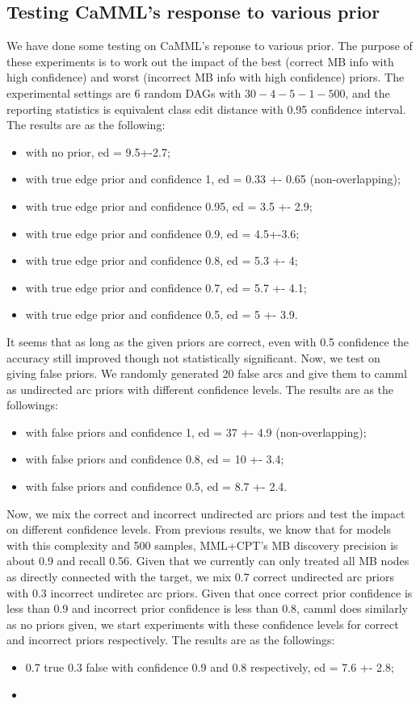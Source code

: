 \subsection{Testing CaMML's response to various prior}
We have done some testing on CaMML's reponse to various prior. The purpose of these experiments is to work out the impact of the best (correct MB info with high confidence) and worst (incorrect MB info with high confidence) priors. The experimental settings are 6 random DAGs with $30-4-5-1-500$, and the reporting statistics is equivalent class edit distance with 0.95 confidence interval. The results are as the following: 
\begin{itemize}
\item with no prior, ed = 9.5+-2.7;
\item with true edge prior and confidence 1, ed = 0.33 +- 0.65 (non-overlapping);
\item with true edge prior and confidence 0.95, ed = 3.5 +- 2.9;
\item with true edge prior and confidence 0.9, ed = 4.5+-3.6;
\item with true edge prior and confidence 0.8, ed = 5.3 +- 4;
\item with true edge prior and confidence 0.7, ed = 5.7 +- 4.1;
\item with true edge prior and confidence 0.5, ed = 5 +- 3.9.
\end{itemize}
It seems that as long as the given priors are correct, even with 0.5 confidence the accuracy still improved though not statistically significant. Now, we test on giving false priors. We randomly generated 20 false arcs and give them to camml as undirected arc priors with different confidence levels. The results are as the followings: 
\begin{itemize}
\item with false priors and confidence 1, ed = 37 +- 4.9 (non-overlapping); 
\item with false priors and confidence 0.8, ed = 10 +- 3.4;
\item with false priors and confidence 0.5, ed = 8.7 +- 2.4.
\end{itemize}
Now, we mix the correct and incorrect undirected arc priors and test the impact on different confidence levels. From previous results, we know that for models with this complexity and 500 samples, MML+CPT's MB discovery precision is about 0.9 and recall 0.56. Given that we currently can only treated all MB nodes as directly connected with the target, we mix 0.7 correct undirected arc priors with 0.3 incorrect undiretec arc priors. Given that once correct prior confidence is less than 0.9 and incorrect prior confidence is less than 0.8, camml does similarly as no priors given, we start experiments with these confidence levels for correct and incorrect priors respectively. The results are as the followings: 
\begin{itemize}
\item 0.7 true 0.3 false with confidence 0.9 and 0.8 respectively, ed = 7.6 +- 2.8;
\item 
\end{itemize}

